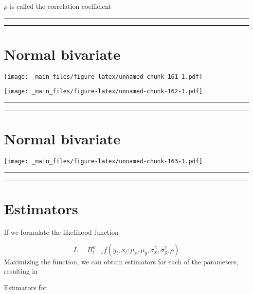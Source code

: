 \documentclass[
]{book}
\begin{document}
\(\rho\) is called the correlation coefficient

\begin{center}\rule{0.5\linewidth}{0.5pt}\end{center}

\begin{center}\rule{0.5\linewidth}{0.5pt}\end{center}

\hypertarget{normal-bivariate-1}{%
\section{Normal bivariate}\label{normal-bivariate-1}}

\texttt{[image: \_main\_files/figure-latex/unnamed-chunk-161-1.pdf]}

\texttt{[image: \_main\_files/figure-latex/unnamed-chunk-162-1.pdf]}

\begin{center}\rule{0.5\linewidth}{0.5pt}\end{center}

\begin{center}\rule{0.5\linewidth}{0.5pt}\end{center}

\hypertarget{normal-bivariate-2}{%
\section{Normal bivariate}\label{normal-bivariate-2}}

\texttt{[image: \_main\_files/figure-latex/unnamed-chunk-163-1.pdf]}

\begin{center}\rule{0.5\linewidth}{0.5pt}\end{center}

\begin{center}\rule{0.5\linewidth}{0.5pt}\end{center}

\hypertarget{estimators}{%
\section{Estimators}\label{estimators}}

If we formulate the likelihood function

\[L=\Pi_{i=1}^n f(y_i,x_i; \mu_x, \mu_y, \sigma^2_x, \sigma_y^2, \rho)\]
Maximizing the function, we can obtain estimators for each of the parameters, resulting in

Estimators for
\end{document}

